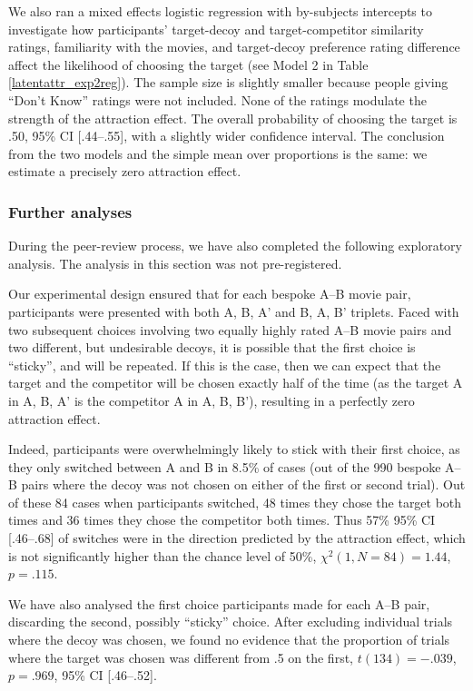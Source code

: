 \documentclass[12pt, a4paper]{article}
\begin{document}
We also ran a mixed effects logistic regression with by-subjects intercepts to investigate how participants' target-decoy and target-competitor similarity ratings, familiarity with the movies, and target-decoy preference rating difference affect the likelihood of choosing the target (see Model 2 in Table \ref{latentattr_exp2reg}). The sample size is slightly smaller because people giving ``Don't Know'' ratings were not included. None of the ratings modulate the strength of the attraction effect. The overall probability of choosing the target is .50, 95\% CI [.44--.55], with a slightly wider confidence interval. The conclusion from the two models and the simple mean over proportions is the same: we estimate a precisely zero attraction effect.

\subsubsection*{Further analyses}

During the peer-review process, we have also completed the following exploratory analysis. The analysis in this section was not pre-registered.

Our experimental design ensured that for each bespoke A--B movie pair, participants were presented with both A, B, A' and B, A, B' triplets. Faced with two subsequent choices involving two equally highly rated A--B movie pairs and two different, but undesirable decoys, it is possible that the first choice is  ``sticky'', and will be repeated. If this is the case, then we can expect that the target and the competitor will be chosen exactly half of the time (as the target A in A, B, A' is the competitor A in A, B, B'), resulting in a perfectly zero attraction effect. 

Indeed, participants were overwhelmingly likely to stick with their first choice, as they only switched between A and B in 8.5\% of cases (out of the 990 bespoke A--B pairs where the decoy was not chosen on either of the first or second trial). Out of these 84 cases when participants switched, 48 times they chose the target both times and 36 times they chose the competitor both times. Thus 57\% 95\% CI [.46--.68] of switches were in the direction predicted by the attraction effect, which is not significantly higher than the chance level of 50\%, ${\chi}^2(1, N = 84)=1.44$, $p=.115$. 

We have also analysed the first choice participants made for each A--B pair, discarding the second, possibly ``sticky'' choice.  
After excluding individual trials where the decoy was chosen, we found no evidence that the proportion of trials where the target was chosen  was different from .5 on the first, $t(134)=-.039$, $p=.969$, 95\% CI [.46--.52]. 
\end{document}
